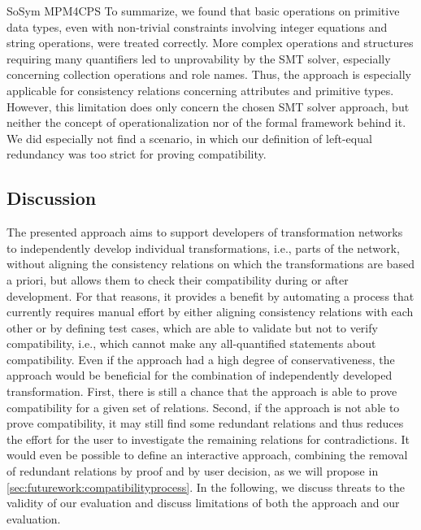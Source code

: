 \begin{copiedFrom}{SoSym MPM4CPS}
To summarize, we found that basic operations on primitive data types, even with non-trivial constraints involving integer equations and string operations, were treated correctly.
More complex operations and structures requiring many quantifiers led to unprovability by the SMT solver, especially concerning collection operations and role names.
Thus, the approach is especially applicable for consistency relations concerning attributes and primitive types.
However, this limitation does only concern the chosen SMT solver approach, but neither the concept of operationalization nor of the formal framework behind it.
We did especially not find a scenario, in which our definition of left-equal redundancy was too strict for proving compatibility.


\subsection{Discussion}

The presented approach aims to support developers of transformation networks to independently develop individual transformations, i.e., parts of the network, without aligning the consistency relations on which the transformations are based a priori, but allows them to check their compatibility during or after development.
For that reasons, it provides a benefit by automating a process that currently requires manual effort by either aligning consistency relations with each other or by defining test cases, which are able to validate but not to verify compatibility, i.e., which cannot make any all-quantified statements about compatibility.
Even if the approach had a high degree of conservativeness, the approach would be beneficial for the combination of independently developed transformation.
First, there is still a chance that the approach is able to prove compatibility for a given set of relations.
Second, if the approach is not able to prove compatibility, it may still find some redundant relations and thus reduces the effort for the user to investigate the remaining relations for contradictions.
It would even be possible to define an interactive approach, combining the removal of redundant relations by proof and by user decision, as we will propose in \autoref{sec:futurework:compatibilityprocess}.
%
In the following, we discuss threats to the validity of our evaluation and discuss limitations of both the approach and our evaluation.


\end{copiedFrom}
